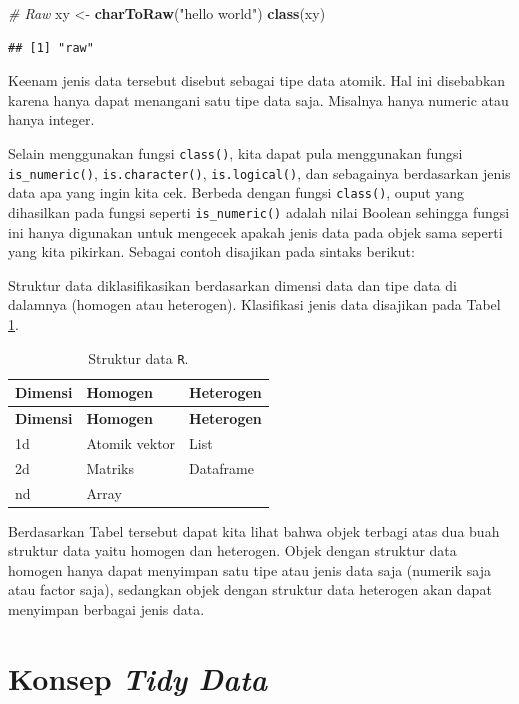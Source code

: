 \documentclass[12pt,]{krantz}
\newenvironment{Shaded}{\begin{snugshade}}{\end{snugshade}}
\newcommand{\CommentTok}[1]{\textcolor[rgb]{0.56,0.35,0.01}{\textit{#1}}}
\newcommand{\KeywordTok}[1]{\textcolor[rgb]{0.13,0.29,0.53}{\textbf{#1}}}
\newcommand{\NormalTok}[1]{#1}
\newcommand{\StringTok}[1]{\textcolor[rgb]{0.31,0.60,0.02}{#1}}
\begin{document}
\begin{Shaded}
\begin{Highlighting}[]
\CommentTok{# Raw}
\NormalTok{xy <-}\StringTok{ }\KeywordTok{charToRaw}\NormalTok{(}\StringTok{"hello world"}\NormalTok{)}
\KeywordTok{class}\NormalTok{(xy)}
\end{Highlighting}
\end{Shaded}

\begin{verbatim}
## [1] "raw"
\end{verbatim}

Keenam jenis data tersebut disebut sebagai tipe data atomik. Hal ini disebabkan karena hanya dapat menangani satu tipe data saja. Misalnya hanya numeric atau hanya integer.

Selain menggunakan fungsi \texttt{class()}, kita dapat pula menggunakan fungsi \texttt{is\_numeric()}, \texttt{is.character()}, \texttt{is.logical()}, dan sebagainya berdasarkan jenis data apa yang ingin kita cek. Berbeda dengan fungsi \texttt{class()}, ouput yang dihasilkan pada fungsi seperti \texttt{is\_numeric()} adalah nilai Boolean sehingga fungsi ini hanya digunakan untuk mengecek apakah jenis data pada objek sama seperti yang kita pikirkan. Sebagai contoh disajikan pada sintaks berikut:

Struktur data diklasifikasikan berdasarkan dimensi data dan tipe data di dalamnya (homogen atau heterogen). Klasifikasi jenis data disajikan pada Tabel \ref{tab:strukturdata}.

\begin{longtable}[]{@{}lll@{}}
\caption{\label{tab:strukturdata} Struktur data \texttt{R}.}\tabularnewline
\toprule
\textbf{Dimensi} & \textbf{Homogen} & \textbf{Heterogen}\tabularnewline
\midrule
\endfirsthead
\toprule
\textbf{Dimensi} & \textbf{Homogen} & \textbf{Heterogen}\tabularnewline
\midrule
\endhead
1d & Atomik vektor & List\tabularnewline
2d & Matriks & Dataframe\tabularnewline
nd & Array &\tabularnewline
\bottomrule
\end{longtable}

Berdasarkan Tabel tersebut dapat kita lihat bahwa objek terbagi atas dua buah struktur data yaitu homogen dan heterogen. Objek dengan struktur data homogen hanya dapat menyimpan satu tipe atau jenis data saja (numerik saja atau factor saja), sedangkan objek dengan struktur data heterogen akan dapat menyimpan berbagai jenis data.

\hypertarget{tidydata}{%
\section{\texorpdfstring{Konsep \emph{Tidy Data}}{Konsep Tidy Data}}\label{tidydata}}
\end{document}
